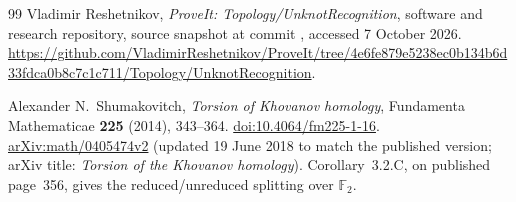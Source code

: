 \begin{thebibliography}{99}
Vladimir Reshetnikov,
\emph{ProveIt: Topology/UnknotRecognition},
software and research repository, source snapshot at commit
\pin, accessed 7 October 2026.
\url{https://github.com/VladimirReshetnikov/ProveIt/tree/4e6fe879e5238ec0b134b6d33fdca0b8c7c1c711/Topology/UnknotRecognition}.

Alexander N.~Shumakovitch,
\emph{Torsion of Khovanov homology},
Fundamenta Mathematicae \textbf{225} (2014), 343--364.
\href{https://doi.org/10.4064/fm225-1-16}{doi:10.4064/fm225-1-16}.
\href{https://arxiv.org/abs/math/0405474v2}{arXiv:math/0405474v2}
(updated 19 June 2018 to match the published version; arXiv title:
\emph{Torsion of the Khovanov homology}).
Corollary~3.2.C, on published page~356, gives the reduced/unreduced
splitting over $\mathbb F_2$.

\end{thebibliography}
